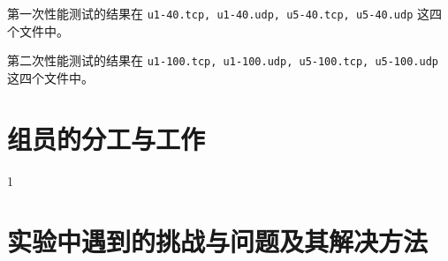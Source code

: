 第一次性能测试的结果在 \texttt{u1-40.tcp, u1-40.udp, u5-40.tcp, u5-40.udp} 这四个文件中。

第二次性能测试的结果在 \texttt{u1-100.tcp, u1-100.udp, u5-100.tcp, u5-100.udp} 这四个文件中。

\section{组员的分工与工作}

1\cite{long2015fully}

\section{实验中遇到的挑战与问题及其解决方法}